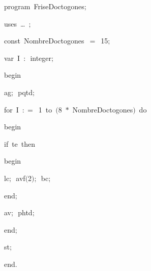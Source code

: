 
{
\parindent {}
\medskip

\carrenoir
\vspace{\neglskip}\mbox{\blc  \idt  \mcl program\idt\ FriseDoctogones$;$
}\par 
\vspace{\neglskip}\mbox{\blc \blk\idt \mcl uses\idt \ \ldots\ $;$
}\par 
\pagebreak[3] 
\vspace{\neglskip}\mbox{\blc  \blk\idt  \mcl const\idt \ NombreDoctogones\ $=$\ 15$;$}\par 
\pagebreak[3] 
\vspace{\neglskip}\mbox{\blc  \blk\idt  \mcl var\idt \ I\ $:$\ integer$;$}\par 
\vspace{\neglskip}\mbox{\blc  \idt  \mcl begin\idt }\par 
\vspace{\neglskip}\mbox{\blc  \blk\idt  ag$;$\ pqtd$;$\ }\par 
\pagebreak[3] 
\vspace{\neglskip}\mbox{\blc  \blk\idt  \mcl for\idt \ I\ $:$$=$\ 1\ \mcl to\idt \ $($8\ $\ast$\ NombreDoctogones$)$\ \mcl do\idt \ }\par 
\vspace{\neglskip}\mbox{\blc  \blk\blk\idt  \mcl begin\idt }\par 
\pagebreak[3] 
\vspace{\neglskip}\mbox{\blc  \blk\blk\blk\idt  \mcl if\idt \ te\ \mcl then\idt }\par 
\vspace{\neglskip}\mbox{\blc  \blk\blk\blk\blk\idt  \mcl begin\idt }\par 
\vspace{\neglskip}\mbox{\blc  \blk\blk\blk\blk\blk\idt  lc$;$\ avf$($2$)$$;$\ bc$;$\ }\par 
\vspace{\neglskip}\mbox{\blc  \blk\blk\blk\blk\idt  \mcl end\idt $;$}\par 
\vspace{\neglskip}\mbox{\blc  \blk\blk\blk\idt  av$;$\ phtd$;$\ }\par 
\vspace{\neglskip}\mbox{\blc  \blk\blk\idt  \mcl end\idt $;$}\par 
\vspace{\neglskip}\mbox{\blc  \blk\idt  st$;$\ }\par 
\vspace{\neglskip}\mbox{\blc  \idt  \mcl end\idt $.$}\par 

\medskip }

